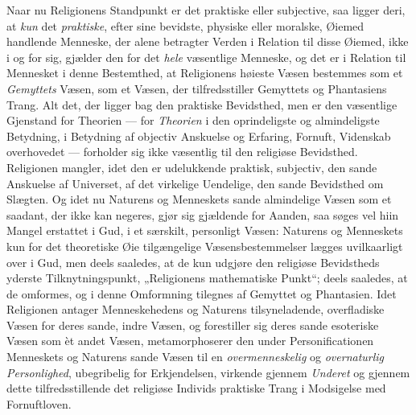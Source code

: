 Naar nu Religionens Standpunkt er det praktiske eller subjective, saa ligger
deri, at \emph{kun} det \emph{praktiske}, efter sine bevidste, physiske eller
moralske, Øiemed handlende Menneske, der alene betragter Verden i Relation til
disse Øiemed,
 ikke i og for sig, gjælder den for det \emph{hele} væsentlige Menneske, og det er
i Relation til Mennesket i denne Bestemthed, at Religionens høieste Væsen
bestemmes som et \emph{Gemyttets} Væsen, som et Væsen, der tilfredsstiller
Gemyttets og Phantasiens Trang. Alt det, der ligger bag den praktiske
Bevidsthed, men er den væsentlige Gjenstand for Theorien --- for \emph{Theorien} i
den oprindeligste og almindeligste Betydning, i Betydning af objectiv Anskuelse
og Erfaring, Fornuft, Videnskab overhovedet --- forholder sig ikke væsentlig
til den religiøse Bevidsthed. Religionen mangler, idet den er udelukkende
praktisk, subjectiv, den sande Anskuelse af Universet, af det virkelige
Uendelige, den sande Bevidsthed om Slægten. Og idet nu Naturens og Menneskets
sande almindelige Væsen som et saadant, der ikke kan negeres, gjør sig
gjældende for Aanden, saa søges vel hiin Mangel erstattet i Gud, i et særskilt,
personligt Væsen: Naturens og Menneskets kun for det theoretiske Øie
tilgængelige Væsensbestemmelser lægges uvilkaarligt over i Gud, men deels
saaledes, at de kun udgjøre den religiøse Bevidstheds yderste
Tilknytningspunkt, „Religionens mathematiske Punkt“; deels saaledes, at de
omformes, og i denne Omformning tilegnes af Gemyttet og Phantasien. Idet
Religionen antager Menneskehedens og Naturens tilsyneladende, overfladiske
Væsen for deres sande, indre Væsen, og forestiller sig deres sande esoteriske
Væsen som èt andet Væsen, metamorphoserer den under Personificationen
Menneskets og Naturens sande Væsen til en \emph{overmenneskelig} og
\emph{overnaturlig Personlighed}, ubegribelig for Erkjendelsen, virkende gjennem
\emph{Underet} og gjennem dette tilfredsstillende det religiøse Individs praktiske
Trang i Modsigelse med Fornuftloven.

